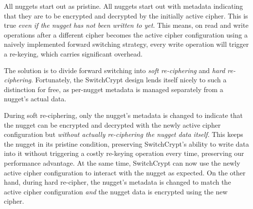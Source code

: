 All nuggets start out as pristine. All nuggets start out with metadata
indicating that they are to be encrypted and decrypted by the initially active
cipher. This is true \emph{even if the nugget has not been written to yet}. This
means, on read and write operations after a different cipher becomes the active
cipher configuration using a naively implemented forward switching strategy,
every write operation will trigger a re-keying, which carries significant
overhead.

The solution is to divide forward switching into \emph{soft re-ciphering} and
\emph{hard re-ciphering}. Fortunately, the SwitchCrypt design lends itself
nicely to such a distinction for free, as per-nugget metadata is managed
separately from a nugget's actual data.

During soft re-ciphering, only the nugget's metadata is changed to indicate that
the nugget can be encrypted and decrypted with the newly active cipher
configuration but \emph{without actually re-ciphering the nugget data itself}.
This keeps the nugget in its pristine condition, preserving SwitchCrypt's
ability to write data into it without triggering a costly re-keying operation
every time, preserving our performance advantage. At the same time, SwitchCrypt
can now use the newly active cipher configuration to interact with the nugget as
expected. On the other hand, during hard re-cipher, the nugget's metadata is
changed to match the active cipher configuration \emph{and} the nugget data is
encrypted using the new cipher.

